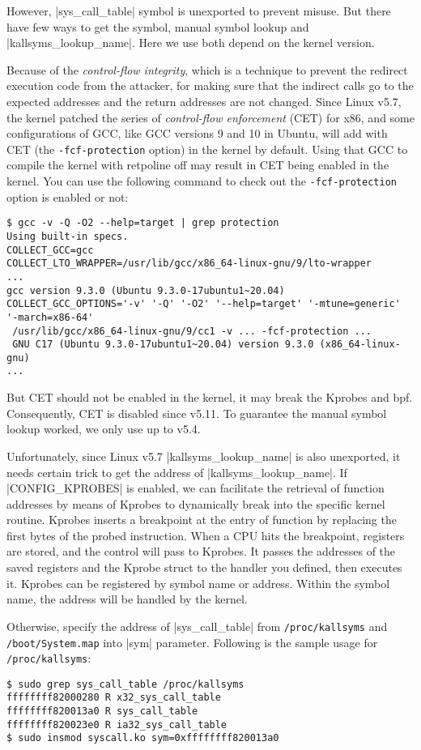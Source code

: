\documentclass[10pt, oneside]{book}
\begin{document}
However, \cpp|sys_call_table| symbol is unexported to prevent misuse.
But there have few ways to get the symbol, manual symbol lookup and \cpp|kallsyms_lookup_name|.
Here we use both depend on the kernel version.

Because of the \textit{control-flow integrity}, which is a technique to prevent the redirect execution code from the attacker, for making sure that the indirect calls go to the expected addresses and the return addresses are not changed.
Since Linux v5.7, the kernel patched the series of \textit{control-flow enforcement} (CET) for x86, and some configurations of GCC, like GCC versions 9 and 10 in Ubuntu, will add with CET (the \verb|-fcf-protection| option) in the kernel by default.
Using that GCC to compile the kernel with retpoline off may result in CET being enabled in the kernel.
You can use the following command to check out the \verb|-fcf-protection| option is enabled or not:
\begin{verbatim}
$ gcc -v -Q -O2 --help=target | grep protection
Using built-in specs.
COLLECT_GCC=gcc
COLLECT_LTO_WRAPPER=/usr/lib/gcc/x86_64-linux-gnu/9/lto-wrapper
...
gcc version 9.3.0 (Ubuntu 9.3.0-17ubuntu1~20.04)
COLLECT_GCC_OPTIONS='-v' '-Q' '-O2' '--help=target' '-mtune=generic' '-march=x86-64'
 /usr/lib/gcc/x86_64-linux-gnu/9/cc1 -v ... -fcf-protection ...
 GNU C17 (Ubuntu 9.3.0-17ubuntu1~20.04) version 9.3.0 (x86_64-linux-gnu)
...
\end{verbatim}
But CET should not be enabled in the kernel, it may break the Kprobes and bpf.
Consequently, CET is disabled since v5.11.
To guarantee the manual symbol lookup worked, we only use up to v5.4.

Unfortunately, since Linux v5.7 \cpp|kallsyms_lookup_name| is also unexported, it needs certain trick to get the address of \cpp|kallsyms_lookup_name|.
If \cpp|CONFIG_KPROBES| is enabled, we can facilitate the retrieval of function addresses by means of Kprobes to dynamically break into the specific kernel routine.
Kprobes inserts a breakpoint at the entry of function by replacing the first bytes of the probed instruction.
When a CPU hits the breakpoint, registers are stored, and the control will pass to Kprobes.
It passes the addresses of the saved registers and the Kprobe struct to the handler you defined, then executes it.
Kprobes can be registered by symbol name or address.
Within the symbol name, the address will be handled by the kernel.

Otherwise, specify the address of \cpp|sys_call_table| from \verb|/proc/kallsyms| and \verb|/boot/System.map| into \cpp|sym| parameter.
Following is the sample usage for \verb|/proc/kallsyms|:
\begin{verbatim}
$ sudo grep sys_call_table /proc/kallsyms
ffffffff82000280 R x32_sys_call_table
ffffffff820013a0 R sys_call_table
ffffffff820023e0 R ia32_sys_call_table
$ sudo insmod syscall.ko sym=0xffffffff820013a0
\end{verbatim}
\end{document}
